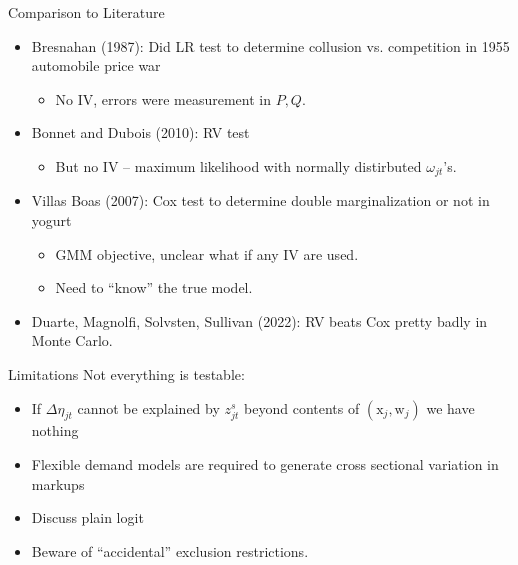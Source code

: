 \begin{frame}{Comparison to Literature}
\begin{itemize}
\item Bresnahan (1987): Did LR test to determine collusion vs. competition in 1955 automobile price war
\begin{itemize}
\item No IV, errors were measurement in $P,Q$.
\end{itemize}
\item Bonnet and Dubois (2010): RV test
\begin{itemize}
\item But no IV -- maximum likelihood with normally distirbuted $\omega_{jt}$'s.
\end{itemize}
\item Villas Boas (2007): Cox test to determine double marginalization or not in yogurt
\begin{itemize}
\item GMM objective, unclear what if any IV are used.
\item Need to ``know'' the true model.
\end{itemize}
\item Duarte, Magnolfi, Solvsten, Sullivan (2022): RV beats Cox pretty badly in Monte Carlo.
\end{itemize}
\end{frame}



\begin{frame}[plain]{Limitations}
Not everything is testable:
\begin{itemize}
\item If $\Delta \eta_{jt}$ cannot be explained by $z_{jt}^s$ beyond contents of $(\mathrm{x}_j,\mathrm{w}_j)$ we have nothing
\item Flexible demand models are required to generate cross sectional variation in markups
\item Discuss plain logit
\item Beware of ``accidental'' exclusion restrictions.
\end{itemize}
\end{frame}



